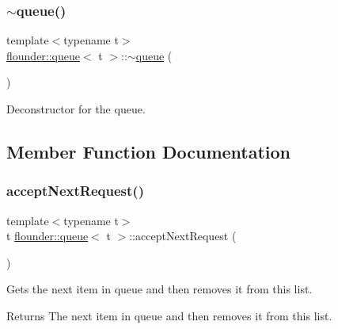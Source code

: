 \subsubsection{\texorpdfstring{$\sim$queue()}{~queue()}}
{\footnotesize\ttfamily template$<$typename t$>$ \\
\hyperlink{classflounder_1_1queue}{flounder\+::queue}$<$ t $>$\+::$\sim$\hyperlink{classflounder_1_1queue}{queue} (\begin{DoxyParamCaption}{ }\end{DoxyParamCaption})\hspace{0.3cm}{\ttfamily [inline]}}



Deconstructor for the queue. 



\subsection{Member Function Documentation}
\mbox{\label{classflounder_1_1queue_a67b97eab69c4ac95fe31d948a569ccce}} 
\subsubsection{\texorpdfstring{accept\+Next\+Request()}{acceptNextRequest()}}
{\footnotesize\ttfamily template$<$typename t$>$ \\
t \hyperlink{classflounder_1_1queue}{flounder\+::queue}$<$ t $>$\+::accept\+Next\+Request (\begin{DoxyParamCaption}{ }\end{DoxyParamCaption})\hspace{0.3cm}{\ttfamily [inline]}}



Gets the next item in queue and then removes it from this list. 

\begin{DoxyReturn}{Returns}
The next item in queue and then removes it from this list. 
\end{DoxyReturn}
\mbox{\label{classflounder_1_1queue_aa2f18bafcb4007630ca63b347b478a66}} 
